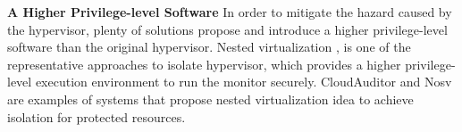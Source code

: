 \documentclass[conference]{IEEEtran}
\begin{document}
\textbf{A Higher Privilege-level Software }
In order to mitigate the hazard caused by the hypervisor, plenty of solutions propose and introduce a higher privilege-level software than the original hypervisor.
Nested virtualization 
\cite{CloudAuditor}, \cite{Nosv}
 is one of the representative approaches to isolate hypervisor, which provides a higher privilege-level execution environment to run the monitor securely. 
CloudAuditor \cite{CloudAuditor} and Nosv \cite{Nosv} are examples of systems that propose nested virtualization idea to achieve isolation for protected resources. 

%

\end{document}
